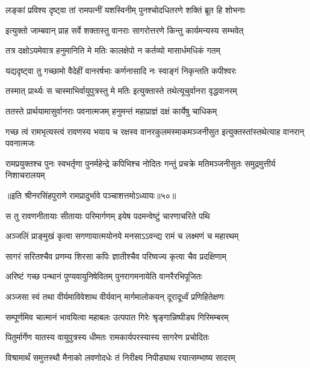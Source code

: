 \twolineshloka
{लङ्कां प्रविश्य दृष्ट्वा तां रामपत्नीं यशस्विनीम्}
{पुनश्चोदधितरणे शक्तिं ब्रूत हि शोभनाः} %

\twolineshloka
{इत्युक्तो जाम्बवान् प्राह सर्वे शक्तास्तु वानराः}
{सागरोत्तरणे किन्तु कार्यमन्यस्य सम्भवेत्} %

\twolineshloka
{तत्र दक्षोऽयमेवात्र हनुमानिति मे मतिः}
{कालक्षेपो न कर्तव्यो मासार्धमधिकं गतम्} %

\twolineshloka
{यद्यदृष्ट्वा तु गच्छामो वैदेहीं वानरर्षभाः}
{कर्णनासादि नः स्वाङ्गं निकृन्तति कपीश्वरः} %

\twolineshloka
{तस्मात् प्रार्थ्यः स चास्माभिर्वायुपुत्रस्तु मे मतिः}
{इत्युक्तास्ते तथेत्यूचुर्वानरा वृद्धवानरम्} %

\twolineshloka
{ततस्ते प्रार्थयामासुर्वानराः पवनात्मजम्}
{हनुमन्तं महाप्राज्ञं दक्षं कार्येषु चाधिकम्} %

\threelineshloka
{गच्छ त्वं रामभृत्यस्त्वं रावणस्य भयाय च}
{रक्षस्व वानरकुलमस्माकमञ्जनीसुत}
{इत्युक्तस्तांस्तथेत्याह वानरान् पवनात्मजः} %

\fourlineindentedshloka
{रामप्रयुक्तश्च पुनः स्वभर्तृणा}
{पुनर्महेन्द्रे कपिभिश्च नोदितः}
{गन्तुं प्रचक्रे मतिमञ्जनीसुतः}
{समुद्रमुत्तीर्य निशाचरालयम्} %

॥इति श्रीनरसिंहपुराणे रामप्रादुर्भावे पञ्चाशत्तमोऽध्यायः॥५०॥



\twolineshloka
{स तु रावणनीतायाः सीतायाः परिमार्गणम्}
{इयेष पदमन्वेष्टुं चारणाचरिते पथि} %

\twolineshloka
{अञ्जलिं प्राङ्मुखं कृत्वा सगणायात्मयोनये}
{मनसाऽऽवन्द्य रामं च लक्ष्मणं च महारथम्} %

\twolineshloka
{सागरं सरितश्चैव प्रणम्य शिरसा कपिः}
{ज्ञातीश्चैव परिष्वज्य कृत्वा चैव प्रदक्षिणाम्} %

\twolineshloka
{अरिष्टं गच्छ पन्थानं पुण्यवायुनिषेवितम्}
{पुनरागमनायेति वानरैरभिपूजितः} %

\twolineshloka
{अञ्जसा स्वं तथा वीर्यमाविवेशाथ वीर्यवान्}
{मार्गमालोकयन् दूरादूर्ध्वं प्रणिहितेक्षणः} %

\twolineshloka
{सम्पूर्णमिव चात्मानं भावयित्वा महाबलः}
{उत्पपात गिरेः श्रृङ्गान्निष्पीड्य गिरिमम्बरम्} %

\twolineshloka
{पितुर्मार्गेण यातस्य वायुपुत्रस्य धीमतः}
{रामकार्यपरस्यास्य सागरेण प्रचोदितः} %

\twolineshloka
{विश्रामार्थं समुत्तस्थौ मैनाको लवणोदधेः}
{तं निरीक्ष्य निपीड्याथ रयात्सम्भाष्य सादरम्} %

